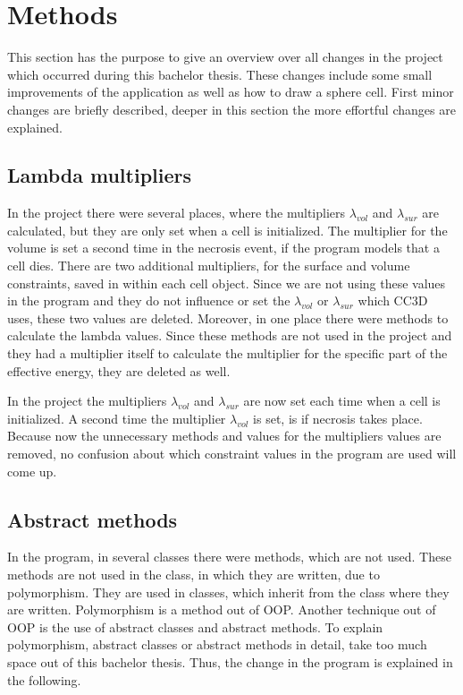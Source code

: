\chapter{Methods}
    
This section has the purpose to give an overview over all changes in the project which occurred during this bachelor thesis. These changes include some small improvements of the application as well as how to draw a sphere cell. First minor changes are briefly described, deeper in this section the more effortful changes are explained. 

\section{Lambda multipliers}
In the project there were several places, where the multipliers $\lambda_{vol}$ and $\lambda_{sur}$ are calculated, but they are only set when a cell is initialized. The multiplier for the volume is set a second time in the necrosis event, if the program models that a cell dies. \newline
There are two additional multipliers, for the surface and volume constraints, saved in within each cell object. Since we are not using these values in the program and they do not influence or set the $\lambda_{vol}$ or $\lambda_{sur}$ which \ac{CC3D} uses, these two values are deleted. Moreover, in one place there were methods to calculate the lambda values. Since these methods are not used in the project and they had a multiplier itself to calculate the multiplier for the specific part of the effective energy, they are deleted as well. 

In the project the multipliers $\lambda_{vol}$ and $\lambda_{sur}$ are now set each time when a cell is initialized. A second time the multiplier $\lambda_{vol}$ is set, is if necrosis takes place. Because now the unnecessary methods and values for the multipliers values are removed, no confusion about which constraint values in the program are used will come up.

\section{Abstract methods}
In the program, in several classes there were methods, which are not used. These methods are not used in the class, in which they are written, due to polymorphism. They are used in classes, which inherit from the class where they are written. Polymorphism is a method out of \ac{OOP}. Another technique out of \ac{OOP} is the use of abstract classes and abstract methods. To explain polymorphism, abstract classes or abstract methods in detail, take too much space out of this bachelor thesis. Thus, the change in the program is explained in the following.

